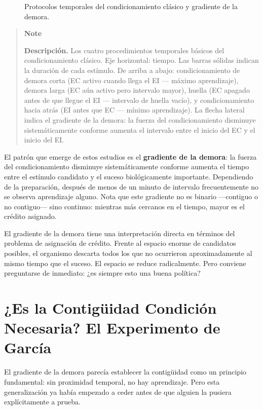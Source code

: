 \documentclass[
  letterpaper,
  DIV=11,
  numbers=noendperiod]{scrreprt}
\begin{document}
\begin{tcolorbox}[enhanced jigsaw, toprule=.15mm, arc=.35mm, colback=white, opacityback=0, colframe=quarto-callout-note-color-frame, breakable, rightrule=.15mm, left=2mm, leftrule=.75mm, bottomrule=.15mm]
\begin{figure}[H]
{}

\caption{\label{fig-protocolos_temporales}Protocolos temporales del
condicionamiento clásico y gradiente de la demora.}

\end{figure}%

\begin{quote}
\textbf{Note}

\textbf{Descripción.} Los cuatro procedimientos temporales básicos del
condicionamiento clásico. Eje horizontal: tiempo. Las barras sólidas
indican la duración de cada estímulo. De arriba a abajo:
condicionamiento de demora corta (EC activo cuando llega el EI ---
máximo aprendizaje), demora larga (EC aún activo pero intervalo mayor),
huella (EC apagado antes de que llegue el EI --- intervalo de huella
vacío), y condicionamiento hacia atrás (EI antes que EC --- mínimo
aprendizaje). La flecha lateral indica el gradiente de la demora: la
fuerza del condicionamiento disminuye sistemáticamente conforme aumenta
el intervalo entre el inicio del EC y el inicio del EI.
\end{quote}

El patrón que emerge de estos estudios es el \textbf{gradiente de la
demora}: la fuerza del condicionamiento disminuye sistemáticamente
conforme aumenta el tiempo entre el estímulo candidato y el suceso
biológicamente importante. Dependiendo de la preparación, después de
menos de un minuto de intervalo frecuentemente no se observa aprendizaje
alguno. Nota que este gradiente no es binario ---contiguo o no
contiguo--- sino continuo: mientras más cercanos en el tiempo, mayor es
el crédito asignado.

El gradiente de la demora tiene una interpretación directa en términos
del problema de asignación de crédito. Frente al espacio enorme de
candidatos posibles, el organismo descarta todos los que no ocurrieron
aproximadamente al mismo tiempo que el suceso. El espacio se reduce
radicalmente. Pero conviene preguntarse de inmediato: ¿es siempre esto
una buena política?

\section{¿Es la Contigüidad Condición Necesaria? El Experimento de
García}\label{es-la-contiguxfcidad-condiciuxf3n-necesaria-el-experimento-de-garcuxeda}

El gradiente de la demora parecía establecer la contigüidad como un
principio fundamental: sin proximidad temporal, no hay aprendizaje. Pero
esta generalización ya había empezado a ceder antes de que alguien la
pusiera explícitamente a prueba.


\end{tcolorbox}
\end{document}

